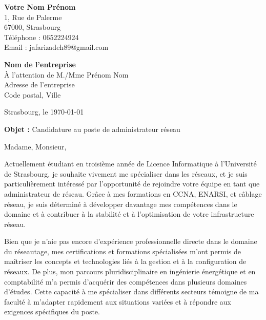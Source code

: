 \documentclass[11pt,a4paper]{letter}
\begin{document}
\begin{flushleft}
\textbf{Votre Nom Prénom} \\
1, Rue de Palerme \\
67000, Strasbourg \\
Téléphone : 0652224924 \\
Email : jafarizadeh89@gmail.com \\
\end{flushleft}


\begin{flushright}
\textbf{Nom de l'entreprise} \\
À l'attention de M./Mme Prénom Nom \\
Adresse de l'entreprise \\
Code postal, Ville \\
\end{flushright}

\vspace{3mm}

\begin{flushright}
Strasbourg, le \today
\end{flushright}

\vspace{5mm}

\noindent\textbf{Objet :} Candidature au poste de administrateur réseau

\vspace{0.5cm}

Madame, Monsieur,

\vspace{0.3cm}

Actuellement étudiant en troisième année de Licence Informatique à l’Université de Strasbourg, je souhaite vivement me spécialiser dans les réseaux, et je suis particulièrement intéressé par l’opportunité de rejoindre votre équipe en tant que administrateur de réseau. Grâce à mes formations en CCNA, ENARSI, et câblage réseau, je suis déterminé à développer davantage mes compétences dans le domaine et à contribuer à la stabilité et à l’optimisation de votre infrastructure réseau.

\vspace{0.3cm}

Bien que je n'aie pas encore d'expérience professionnelle directe dans le domaine du réseautage, mes certifications et formations spécialisées m'ont permis de maîtriser les concepts et technologies liés à la gestion et à la configuration de réseaux. De plus, mon parcours pluridisciplinaire en ingénierie énergétique et en comptabilité m'a permis d'acquérir des compétences dans plusieurs domaines d'études. Cette capacité à me spécialiser dans différents secteurs témoigne de ma faculté à m'adapter rapidement aux situations variées et à répondre aux exigences spécifiques du poste.
\end{document}
